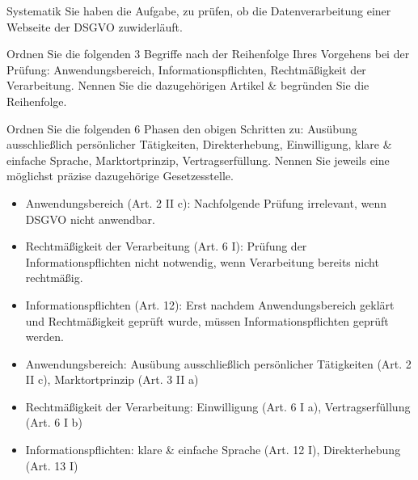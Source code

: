 \documentclass{exercisesheet}
\begin{document}
\begin{eexercises}{Systematik}{
    Sie haben die Aufgabe, zu prüfen, ob die Datenverarbeitung einer Webseite der DSGVO zuwiderläuft.
  }
  \item Ordnen Sie die folgenden 3 Begriffe nach der Reihenfolge Ihres Vorgehens bei der Prüfung: Anwendungsbereich, Informationspflichten, Rechtmäßigkeit der Verarbeitung. Nennen Sie die dazugehörigen Artikel \& begründen Sie die Reihenfolge.
  \item Ordnen Sie die folgenden 6 Phasen den obigen Schritten zu: Ausübung ausschließlich persönlicher Tätigkeiten, Direkterhebung, Einwilligung, klare \& einfache Sprache, Marktortprinzip, Vertragserfüllung. Nennen Sie jeweils eine möglichst präzise dazugehörige Gesetzesstelle.
\end{eexercises}

\begin{solutions}
  \item
  \begin{itemize}
    \item Anwendungsbereich (Art. 2 II c): Nachfolgende Prüfung irrelevant, wenn DSGVO nicht anwendbar.
    \item Rechtmäßigkeit der Verarbeitung (Art. 6 I): Prüfung der Informationspflichten nicht notwendig, wenn Verarbeitung bereits nicht rechtmäßig.
    \item Informationspflichten (Art. 12): Erst nachdem Anwendungsbereich geklärt und Rechtmäßigkeit geprüft wurde, müssen Informationspflichten geprüft werden.
  \end{itemize}
  \item
  \begin{itemize}
    \item Anwendungsbereich: Ausübung ausschließlich persönlicher Tätigkeiten (Art. 2 II c), Marktortprinzip (Art. 3 II a)
    \item Rechtmäßigkeit der Verarbeitung: Einwilligung (Art. 6 I a), Vertragserfüllung (Art. 6 I b)
    \item Informationspflichten: klare \& einfache Sprache (Art. 12 I), Direkterhebung (Art. 13 I)
  \end{itemize}
\end{solutions}
\end{document}

